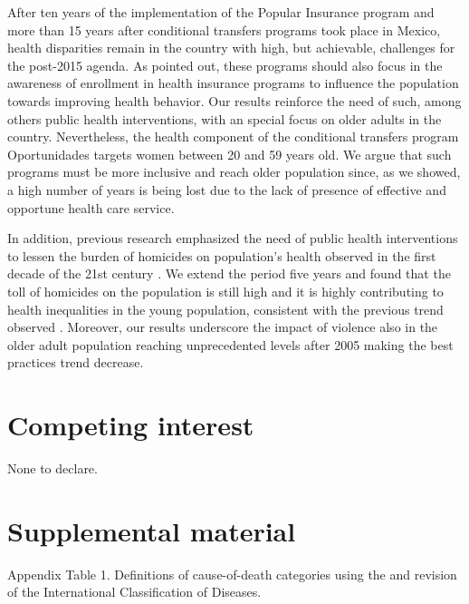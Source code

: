 \documentclass{article}
\begin{document}
\begin{spacing}{1.5}
After ten years of the implementation of the Popular Insurance program and more than 15 years after conditional transfers programs took place in Mexico, health disparities remain in the country with high, but achievable, challenges for the post-2015 agenda. As \citet{biosca2015} pointed out, these programs should also focus in the awareness of enrollment in health insurance programs to influence the population towards improving health behavior. Our results reinforce the need of such, among others public health interventions, with an special focus on older adults in the country. Nevertheless, the health component of the conditional transfers program Oportunidades targets women between 20 and 59 years old. We argue that such programs must be more inclusive and reach older population since, as we showed, a high number of years is being lost due to the lack of presence of effective and opportune health care service. 

In addition, previous research emphasized the need of public health interventions to lessen the burden of homicides on population's health observed in the first decade of the 21st century \citep{canudas2014, Aburto2015}. We extend the period five years and found that the toll of homicides on the population is still high and it is highly contributing to health inequalities in the young population, consistent with the previous trend observed \citep{canudas2014}. Moreover, our results underscore the impact of violence also in the older adult population reaching unprecedented levels after 2005 making the best practices trend decrease. 
\end{spacing}

\section*{Competing interest}
None to declare.

%
\newpage
 
 
 
 \newpage
\section*{Supplemental material}

Appendix Table 1. Definitions of cause-of-death categories using the  and  revision of the International Classification of Diseases.\\
\end{document}
